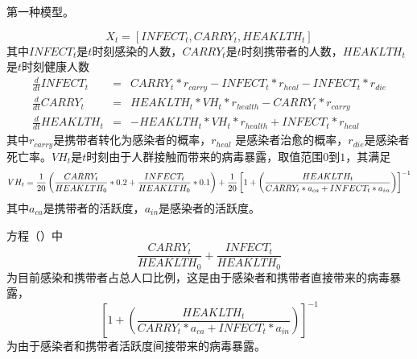 \documentclass{article}
\begin{document}
第一种模型。

\begin{equation}
X_{t}=[INFECT_{t},CARRY_{t},HEAKLTH_{t}]
\end{equation}%
其中$INFECT_{t}$是$t$时刻感染的人数，$CARRY_{t}$是$t$时刻携带者的人数，$HEAKLTH_{t}$是$t$时刻健康人数%
\begin{eqnarray}
\frac{d}{dt}INFECT_{t} &=&CARRY_{t}\ast r_{carry}-INFECT_{t}\ast
r_{heal}-INFECT_{t}\ast r_{die} \\
\frac{d}{dt}CARRY_{t} &=&HEAKLTH_{t}\ast VH_{t}\ast r_{health}-CARRY_{t}\ast
r_{carry} \\
\frac{d}{dt}HEAKLTH_{t} &=&-HEAKLTH_{t}\ast VH_{t}\ast
r_{health}+INFECT_{t}\ast r_{heal}
\end{eqnarray}%
其中$r_{carry}$是携带者转化为感染者的概率，$r_{heal}$%
是感染者治愈的概率，$r_{die}$是感染者死亡率。$VH_{t}$是$t$时刻由于人群接触而带来的病毒暴露，取值范围$0$到$1$，其满足%
\begin{equation}
VH_{t}=\frac{1}{20}\left( \frac{CARRY_{t}}{HEAKLTH_{0}}\ast 0.2+\frac{%
INFECT_{t}}{HEAKLTH_{0}}\ast 0.1\right) +\frac{1}{20}\left[ 1+\left( \frac{%
HEAKLTH_{t}}{CARRY_{t}\ast a_{ca}+INFECT_{t}\ast a_{in}}\right) \right] ^{-1}
\label{1}
\end{equation}%
其中$a_{ca}$是携带者的活跃度，$a_{in}$是感染者的活跃度。

方程（\cite{1}）中\begin{equation}
\frac{CARRY_{t}}{HEAKLTH_{0}}+\frac{INFECT_{t}}{HEAKLTH_{0}}
\end{equation}%
为目前感染和携带者占总人口比例，这是由于感染者和携带者直接带来的病毒暴露，\begin{equation}
\left[ 1+\left( \frac{HEAKLTH_{t}}{CARRY_{t}\ast a_{ca}+INFECT_{t}\ast a_{in}%
}\right) \right] ^{-1}
\end{equation}%
为由于感染者和携带者活跃度间接带来的病毒暴露。
\end{document}
